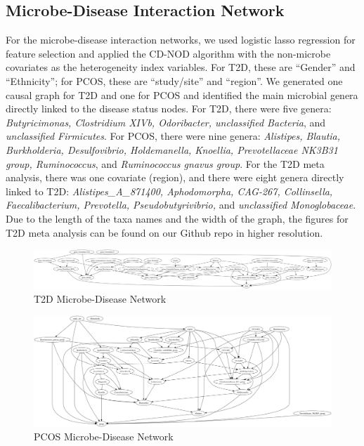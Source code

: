 \documentclass[12pt,letterpaper]{article}
\begin{document}
\subsection{Microbe-Disease Interaction Network}

For the microbe-disease interaction networks, we used logistic lasso regression for feature selection and applied the CD-NOD algorithm with the non-microbe covariates as the heterogeneity index variables. For T2D, these are “Gender” and “Ethnicity”; for PCOS, these are “study/site” and “region”. We generated one causal graph for T2D and one for PCOS and identified the main microbial genera directly linked to the disease status nodes. For T2D, there were five genera: \textit{Butyricimonas, Clostridium XIVb, Odoribacter, unclassified Bacteria}, and \textit{unclassified Firmicutes}. For PCOS, there were nine genera: \textit{Alistipes, Blautia, Burkholderia, Desulfovibrio, Holdemanella, Knoellia, Prevotellaceae NK3B31 group, Ruminococcus}, and \textit{Ruminococcus gnavus group}. For the T2D meta analysis, there was one covariate (region), and there were eight genera directly linked to T2D: \textit{Alistipes\_A\_871400, Aphodomorpha, CAG-267, Collinsella, Faecalibacterium, Prevotella, Pseudobutyrivibrio,} and \textit{unclassified Monoglobaceae}. Due to the length of the taxa names and the width of the graph, the figures for T2D meta analysis can be found on our Github repo in higher resolution. 

\begin{figure}[h!]
  \centering
  \includegraphics[width=\linewidth]{../graphs/t2d/cdnod_norm.png}
  \caption{T2D Microbe-Disease Network}
  \label{fig:t2dcdnod}
\end{figure}

\begin{figure}[h!]
  \centering
  \includegraphics[width=\linewidth]{../graphs/pcos/cdnod_norm.png}
  \caption{PCOS Microbe-Disease Network}
  \label{fig:pcoscdnod}
\end{figure}
\end{document}
